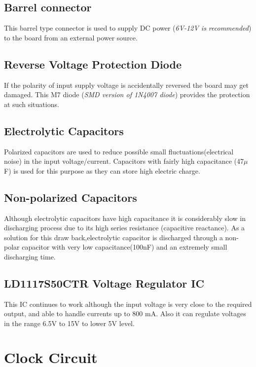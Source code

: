 \documentclass[a4paper,11pt,twocolumn]{article}
\begin{document}
\subsection{Barrel connector}

This barrel type connector is used to supply DC power (\textit{6V-12V is recommended}) to the board from an external power source.

\subsection{Reverse Voltage Protection Diode}

If the polarity of input supply voltage is accidentally reversed the board may get damaged. This M7 diode (\textit{SMD version of 1N4007 diode}) provides the protection at such situations. 

\subsection{Electrolytic Capacitors}

Polarized capacitors are used to reduce  possible small fluctuations(electrical noise) in the input voltage/current. Capacitors with fairly high capacitance (47$\mu$F) is used for this purpose as they can store high electric charge.

\subsection{Non-polarized Capacitors}

Although electrolytic capacitors have high capacitance it is considerably slow in discharging process due to its high series resistance (capacitive reactance). As a solution for this draw back,electrolytic capacitor is discharged through a  non-polar capacitor with very low capacitance(100nF) and an extremely small discharging time.

\subsection{LD1117S50CTR Voltage Regulator IC}

This IC continues to work although the input voltage is very close to the required output, and able to handle currents up to 800 mA. Also it can regulate voltages in the range 6.5V to 15V to lower 5V level\cite{lowdrop}.


\section{Clock Circuit}
\end{document}
